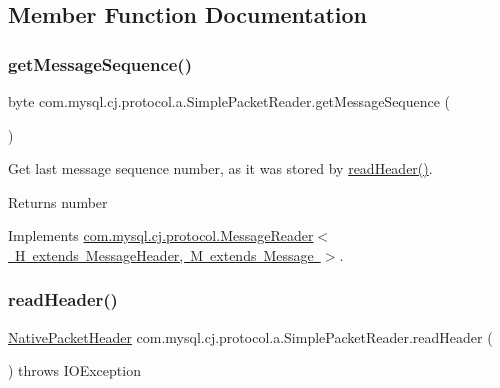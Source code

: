 \subsection{Member Function Documentation}
\mbox{\label{classcom_1_1mysql_1_1cj_1_1protocol_1_1a_1_1_simple_packet_reader_ac89192017a4a7eb78ab9679925857fd6}} 
\subsubsection{\texorpdfstring{get\+Message\+Sequence()}{getMessageSequence()}}
{\footnotesize\ttfamily byte com.\+mysql.\+cj.\+protocol.\+a.\+Simple\+Packet\+Reader.\+get\+Message\+Sequence (\begin{DoxyParamCaption}{ }\end{DoxyParamCaption})}

Get last message sequence number, as it was stored by \mbox{\hyperlink{classcom_1_1mysql_1_1cj_1_1protocol_1_1a_1_1_simple_packet_reader_a2f65d760ce356bbb432f3d8e804a24bc}{read\+Header()}}.

\begin{DoxyReturn}{Returns}
number 
\end{DoxyReturn}


Implements \mbox{\hyperlink{interfacecom_1_1mysql_1_1cj_1_1protocol_1_1_message_reader_ac4a36fb287c5308dd3d7e6157ef4e237}{com.\+mysql.\+cj.\+protocol.\+Message\+Reader$<$ H extends Message\+Header, M extends Message $>$}}.

\mbox{\label{classcom_1_1mysql_1_1cj_1_1protocol_1_1a_1_1_simple_packet_reader_a2f65d760ce356bbb432f3d8e804a24bc}} 
\subsubsection{\texorpdfstring{read\+Header()}{readHeader()}}
{\footnotesize\ttfamily \mbox{\hyperlink{classcom_1_1mysql_1_1cj_1_1protocol_1_1a_1_1_native_packet_header}{Native\+Packet\+Header}} com.\+mysql.\+cj.\+protocol.\+a.\+Simple\+Packet\+Reader.\+read\+Header (\begin{DoxyParamCaption}{ }\end{DoxyParamCaption}) throws I\+O\+Exception}

